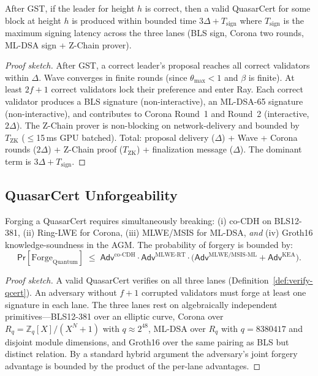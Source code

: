 \begin{theorem}[Liveness]
\label{thm:liveness}
After GST, if the leader for height $h$ is correct, then a valid
QuasarCert for some block at height $h$ is produced within bounded time
$3\Delta + T_{\mathrm{sign}}$ where $T_{\mathrm{sign}}$ is the maximum
signing latency across the three lanes (BLS sign,
Corona two rounds, ML-DSA sign + Z-Chain prover).
\end{theorem}

\begin{proof}[Proof sketch]
After GST, a correct leader's proposal reaches all correct validators
within $\Delta$. Wave converges in finite rounds (since
$\theta_{\max} < 1$ and $\beta$ is finite). At least $2f+1$ correct
validators lock their preference and enter Ray. Each correct validator
produces a BLS signature (non-interactive), an ML-DSA-65 signature
(non-interactive), and contributes to Corona Round~1 and Round~2
(interactive, $2\Delta$). The Z-Chain prover is non-blocking on
network-delivery and bounded by $T_{\mathrm{ZK}}$ ($\leq$15\,ms GPU
batched). Total: proposal delivery ($\Delta$) + Wave + Corona rounds
($2\Delta$) + Z-Chain proof ($T_{\mathrm{ZK}}$) + finalization message
($\Delta$). The dominant term is $3\Delta + T_{\mathrm{sign}}$.
\end{proof}

\subsection{QuasarCert Unforgeability}

\begin{theorem}
\label{thm:unforgeability}
Forging a QuasarCert requires simultaneously breaking: (i) co-CDH on
BLS12-381, (ii) Ring-LWE for Corona, (iii) MLWE/MSIS for ML-DSA,
\emph{and} (iv) Groth16 knowledge-soundness in the AGM. The probability
of forgery is bounded by:
\[
\mathsf{Pr}[\mathrm{Forge}_{\mathrm{Quantum}}] \;\leq\;
\mathsf{Adv}^{\text{co-CDH}} \cdot
\mathsf{Adv}^{\text{MLWE-RT}} \cdot
\bigl(\mathsf{Adv}^{\text{MLWE/MSIS-ML}} +
       \mathsf{Adv}^{\text{KEA}}\bigr).
\]
\end{theorem}

\begin{proof}[Proof sketch]
A valid QuasarCert verifies on all three lanes (Definition~\ref{def:verify-qcert}).
An adversary without $f+1$ corrupted validators must forge at least one
signature in each lane. The three lanes rest on algebraically independent
primitives---BLS12-381 over an elliptic curve, Corona over $R_q =
\mathbb{Z}_q[X]/(X^N+1)$ with $q \approx 2^{48}$, ML-DSA over $R_q$ with
$q = 8380417$ and disjoint module dimensions, and Groth16 over the same
pairing as BLS but distinct relation. By a standard hybrid argument the
adversary's joint forgery advantage is bounded by the product of the
per-lane advantages.
\end{proof}

